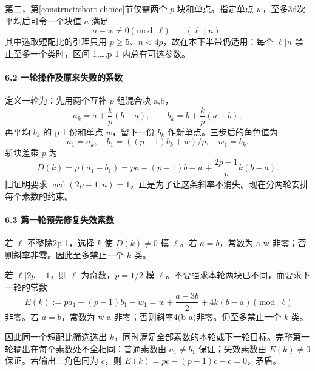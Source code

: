 {第二，}第\ref{construct:short-choice}节{仅需两个} {\ensuremath{p}} {块和单点。指定单点} {\ensuremath{w}，至多3d次平均后可令一个块值} {\ensuremath{a}} {满足} \[
a-w\ne0\pmod\ell\qquad(\ell\mid n).
\tag{C9.14}
\] {其中选取短配比的引理只用} {\ensuremath{p\ge 5}、\ensuremath{n<4p}，故在本下半带仍适用：每个} {\ensuremath{\ell |n}} {禁止至多一个类时，区间} {1,\ldots,p-1} {内总有可选参数。}

\paragraph*{\texorpdfstring{{6.2} {一轮操作及原来失败的系数}}{6.2 一轮操作及原来失败的系数}}\label{C9-h67}

{定义一轮为：先用两个互补} {\ensuremath{p}} {组混合块} {a,b，} \[
a_k=a+\frac{k}{p}(b-a),\qquad
b_k=b+\frac{k}{p}(a-b),
\] {再平均} {\ensuremath{b_{k}}} {的} {p-1} {份和单点} {\ensuremath{w}，留下一份} {\ensuremath{b_{k}}} {作新单点。三步后的角色值为} \[
a_1=a_k,\quad b_1=((p-1)b_k+w)/p,\quad w_1=b_k.
\] {新块差乘} {\ensuremath{p}} {为} \[
D(k)=p(a_1-b_1)
=pa-(p-1)b-w+\frac{2p-1}{p}k(b-a).
\tag{C9.15}
\] {旧证明要求} {\ensuremath{\operatorname{gcd}(2p-1,n)=1}，正是为了让这条斜率不消失。现在分两轮安排每个素数的约束。}

\paragraph*{\texorpdfstring{{6.3} {第一轮预先修复失效素数}}{6.3 第一轮预先修复失效素数}}\label{C9-h68}

{若} {\ensuremath{\ell }} {不整除2p-1，选择} {\ensuremath{k}} {使} {\ensuremath{D(k)\ne 0}} {模} {\ensuremath{\ell }。若} {\ensuremath{a=b}，常数为} {a-w} {非零；否则斜率非零。因此至多禁止一个} {\ensuremath{k}} {类。}

{若} {\ensuremath{\ell |2p-1}，则} {\ensuremath{\ell }} {为奇数，\ensuremath{p=1/2}} {模} {\ensuremath{\ell }。不要强求本轮两块已不同，而要求下一轮的常数} \[
E(k):=p a_1-(p-1)b_1-w_1
=w+\frac{a-3b}{2}+4k(b-a)\pmod\ell
\tag{C9.16}
\] {非零。若} {\ensuremath{a=b}，常数为} {w-a} {非零；否则斜率4(b-a)非零。仍至多禁止一个} {\ensuremath{k}} {类。}

{因此同一个短配比筛选选出} {\ensuremath{k}，同时满足全部素数的本轮或下一轮目标。完整第一轮输出在每个素数处不全相同：普通素数由} {\ensuremath{a_{1}\ne b_{1}}} {保证；失效素数由} {\ensuremath{E(k)\ne 0}} {保证。若输出三角色同为} {\ensuremath{c}，则} {\ensuremath{E(k)=pc-(p-1)c-c=0}，矛盾。}

